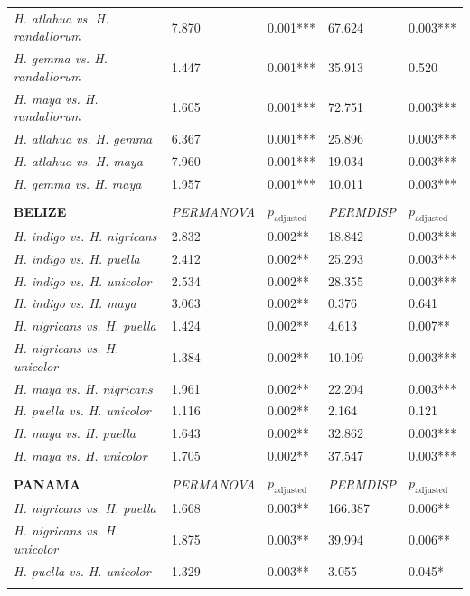\begin{xltabular}{\textwidth}{p{4.5cm}*{4}{X}}
\emph{H. atlahua vs. H. randallorum} & 7.870 & 0.001*** & 67.624 & 0.003*** \\
\emph{H. gemma vs. H. randallorum} & 1.447 & 0.001*** & 35.913 & 0.520 \\
\emph{H. maya vs. H. randallorum} & 1.605 & 0.001*** & 72.751 & 0.003*** \\
\emph{H. atlahua vs. H. gemma} & 6.367 & 0.001*** & 25.896 & 0.003*** \\
\emph{H. atlahua vs. H. maya} & 7.960 & 0.001*** & 19.034 & 0.003*** \\
\emph{H. gemma vs. H. maya} & 1.957 & 0.001*** & 10.011 & 0.003*** \\\\
\hline \hline
\addlinespace
\textbf{BELIZE} & \emph{PERMANOVA} & $p_{\text{adjusted}}$ & \emph{PERMDISP} & $p_{\text{adjusted}}$ \\
\addlinespace
\hline \hline
\emph{H. indigo vs. H. nigricans} & 2.832 & 0.002** & 18.842 & 0.003*** \\
\emph{H. indigo vs. H. puella} & 2.412 & 0.002** & 25.293 & 0.003*** \\
\emph{H. indigo vs. H. unicolor} & 2.534 & 0.002** & 28.355 & 0.003*** \\
\emph{H. indigo vs. H. maya} & 3.063 & 0.002** & 0.376 & 0.641 \\
\emph{H. nigricans vs. H. puella} & 1.424 & 0.002** & 4.613 & 0.007** \\
\emph{H. nigricans vs. H. unicolor} & 1.384 & 0.002** & 10.109 & 0.003*** \\
\emph{H. maya vs. H. nigricans} & 1.961 & 0.002** & 22.204 & 0.003*** \\
\emph{H. puella vs. H. unicolor} & 1.116 & 0.002** & 2.164 & 0.121 \\
\emph{H. maya vs. H. puella} & 1.643 & 0.002** & 32.862 & 0.003*** \\
\emph{H. maya vs. H. unicolor} & 1.705 & 0.002** & 37.547 & 0.003*** \\\\
\hline \hline
\addlinespace
\textbf{PANAMA} & \emph{PERMANOVA} & $p_{\text{adjusted}}$ & \emph{PERMDISP} & $p_{\text{adjusted}}$ \\
\addlinespace
\hline \hline
\emph{H. nigricans vs. H. puella} & 1.668 & 0.003** & 166.387 & 0.006** \\
\emph{H. nigricans vs. H. unicolor} & 1.875 & 0.003** & 39.994 & 0.006** \\
\emph{H. puella vs. H. unicolor} & 1.329 & 0.003** & 3.055 & 0.045* \\\\

\end{xltabular}
